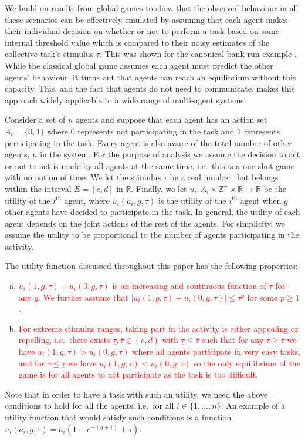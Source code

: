 \documentclass[smallextended]{svjour3}       %
\newcommand{\edit}[1]{\textcolor{red}{#1}}
\def\Z{\mathbb{Z}}    %
\def\R{\mathbb{R}}    %
\begin{document}
We build on results from global games \citep{Carlsson1993} to show that the observed behaviour in all these scenarios can be effectively emulated by assuming that each agent makes their individual decision on whether or not to perform a task based on some internal threshold value which is compared to their noisy estimates of the collective task's stimulus $\tau$. This was shown for the canonical bank run example \citep{Morris2000}. While the classical global game assumes each agent must predict the other agents' behaviour, it turns out that agents can reach an equilibrium without this capacity. This, and the fact that agents do not need to communicate, makes this approach widely applicable to a wide range of multi-agent systems.

Consider a set of $n$ agents and suppose that each agent has an action set $A_i=\{0,1\}$ where $0$ represents not participating in the task and $1$ represents participating in the task. Every agent is also aware of the total number of other agents, $n$ in the system. For the purpose of analysis we assume the decision to act or not to act is made by all agents at the same time, i.e.\ this is a one-shot game with no notion of time. We let the stimulus $\tau$ be a real number that belongs within the interval $E=[c,d]$ in $\R$. Finally, we let $u_i:A_i\times\Z^+\times \R\to \R$ be the utility of the $i^{\text{th}}$ agent, where $u_i(a_i,g,\tau)$ is the utility of the $i^{\text{th}}$ agent when $g$ other agents have decided to participate in the task. 
In general, the utility of each agent depends on the joint actions of the rest of the agents. For simplicity, we assume the utility to be proportional to the number of agents participating in the activity. %

The utility function discussed throughout this paper has the following properties:
\begin{enumerate}[a.]
	\item \edit{$u_i(1,g,\tau)-u_i(0,g,\tau)$ is an increasing and continuous function of $\tau$ for any $g$. We further assume that $|u_i(1,g,\tau)-u_i(0,g,\tau)|\leq \tau^p$ for some $p\geq 1$.}
	\item \edit{For extreme stimulus ranges, taking part in the activity is either appealing or repelling, i.e.\ there exists $\underline{\tau},\bar{\tau}\in (c,d)$ with $\underline{\tau}\leq \bar{\tau}$ such that for any $\tau\geq \bar{\tau}$ we have $u_i(1,g,\tau)>u_i(0,g,\tau)$ where all agents participate in very easy tasks, and for $\tau\leq \underline{\tau}$ we have $u_i(1,g,\tau)<u_i(0,g,\tau)$ so the only equilibrium of the game is for all agents to not participate as the task is too difficult.}
\end{enumerate}
Note that in order to have a task with such an utility, we need the above conditions to hold for all the agents, i.e.\ for all $i\in\{1,\ldots,n\}$. An example of a utility function that would satisfy such conditions is a function $u_i(a_i,g,\tau)=a_i(1-e^{-(g+1)}+\tau)$. 
\end{document}
